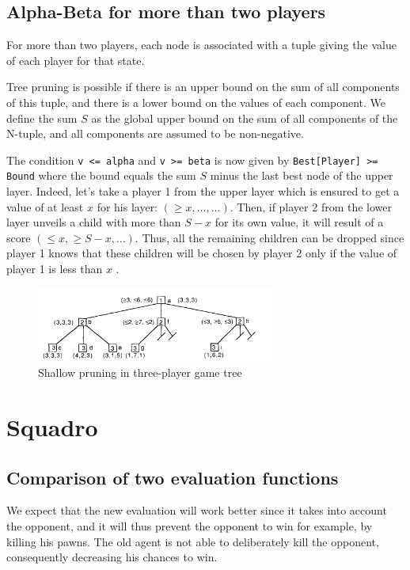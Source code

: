 \documentclass[en]{article}
\newcommand{\py}[1]{\texttt{#1}}
\begin{document}
\subsection{Alpha-Beta for more than two players}

For more than two players, each node is associated with a tuple giving the value of each player for that state.

Tree pruning is possible if there is an upper bound on the sum of all components of this tuple, and there is a lower bound on the values of each component. We define the sum $S$ as the global upper bound on the sum of all components of the N-tuple, and all components are
assumed to be non-negative. 

The condition \py{v <= alpha} and \py{v >= beta} is now given by \py{Best[Player] >= Bound} where the bound equals the sum $S$ minus the last best node of the upper layer. Indeed, let's take a player 1 from the upper layer which is ensured to get a value of at least $x$ for his layer: $(\ge x, \dots, \dots)$. Then, if player 2 from the lower layer unveils a child with more than $S - x$ for its own value, it will result of a score $(\le x, \ge S - x, \dots)$. Thus, all the remaining children can be dropped since player 1 knows that these children will be chosen by player 2 only if the value of player 1 is less than $x$ \cite{multiplayer}.

\begin{figure}[H]
 \centering
 \includegraphics[width=0.7\textwidth]{multiplayer.png}
 \caption{Shallow pruning in three-player game tree \cite{multiplayer}}
 \label{fig:multiplayer}
\end{figure}


\section{Squadro}

\subsection{Comparison of two evaluation functions}

We expect that the new evaluation will work better since it takes into account the opponent, and it will thus prevent the opponent to win for example, by killing his pawns. The old agent is not able to deliberately kill the opponent, consequently decreasing his chances to win.
\end{document}
